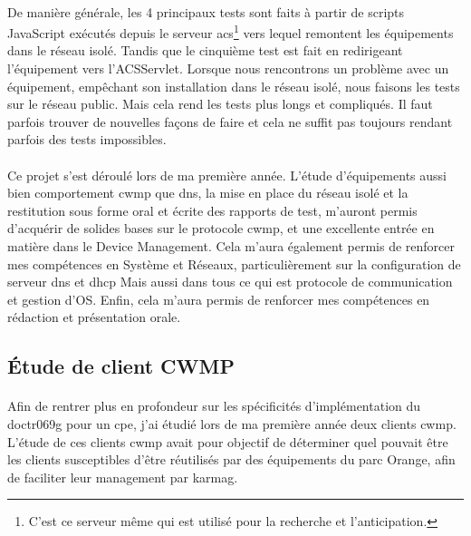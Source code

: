 \documentclass[12pt,a4paper]{report}
\begin{document}
\paragraph*{}De manière générale, les 4 principaux tests sont faits à partir de scripts JavaScript exécutés depuis le serveur \gls{acs}\footnote{C'est ce serveur même qui est utilisé pour la recherche et l'anticipation.} vers lequel remontent les équipements dans le réseau isolé. Tandis que le cinquième test est fait en redirigeant l’équipement vers l’ACSServlet. Lorsque nous rencontrons un problème avec un équipement, empêchant son installation dans le réseau isolé, nous faisons les tests sur le réseau public. Mais cela rend les tests plus longs et compliqués. Il faut parfois trouver de nouvelles façons de faire et cela ne suffit pas toujours rendant parfois des tests impossibles. \\
\paragraph*{}Ce projet s'est déroulé lors de ma première année. L'étude d'équipements aussi bien comportement \gls{cwmp} que \gls{dns}, la mise en place du réseau isolé et la restitution sous forme oral et écrite des rapports de test, m'auront permis d'acquérir de solides bases sur le protocole \gls{cwmp}, et une excellente entrée en matière dans le Device Management. Cela m'aura également permis de renforcer mes compétences en Système et Réseaux, particulièrement sur la configuration de serveur \gls{dns} et \gls{dhcp} Mais aussi dans tous ce qui est protocole de communication et gestion d'OS. Enfin, cela m'aura permis de renforcer mes compétences en rédaction et présentation orale.\\
\subsection{Étude de client CWMP}
\paragraph*{}Afin de rentrer plus en profondeur sur les spécificités d'implémentation du \gls{doctr069g} pour un \gls{cpe}, j'ai étudié lors de ma première année deux clients \gls{cwmp}. L'étude de ces clients \gls{cwmp} avait pour objectif de déterminer quel pouvait être les clients susceptibles d'être réutilisés par des équipements du parc Orange, afin de faciliter leur management par \gls{karmag}.
\end{document}
